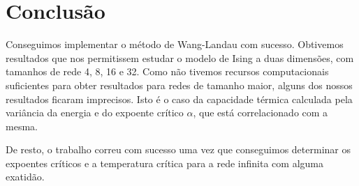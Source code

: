 \documentclass[12pt, a4paper]{article}
\begin{document}
	\pagebreak	
	
	\section{Conclusão}
	
	Conseguimos implementar o método de Wang-Landau com sucesso. Obtivemos resultados que nos permitissem estudar o modelo de Ising a duas dimensões,  com tamanhos de rede 4, 8, 16 e 32. Como não tivemos recursos computacionais suficientes para obter resultados para redes de tamanho maior, alguns dos nossos resultados ficaram imprecisos. Isto é o caso da capacidade térmica calculada pela variância da energia e do expoente crítico $\alpha$, que está correlacionado com a mesma.
	
	De resto, o trabalho correu com sucesso uma vez que conseguimos determinar os expoentes críticos e a temperatura crítica para a rede infinita com alguma exatidão.
		
	\pagebreak
	
		
	
	
\end{document}
